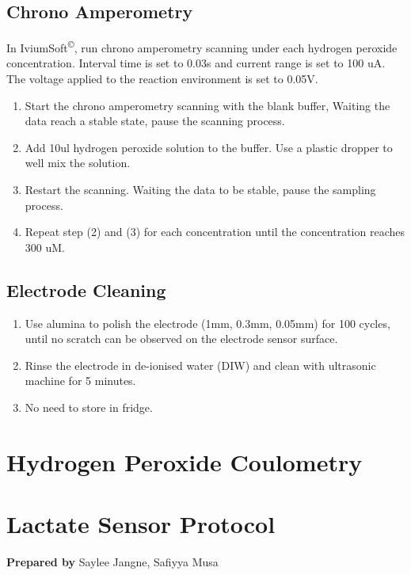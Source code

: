 \begin{appendices}
\subsection{Chrono Amperometry}
In IviumSoft\textsuperscript{\copyright}, run chrono amperometry scanning under each hydrogen peroxide concentration. Interval time is set to 0.03s and current range is set to 100 uA. The voltage applied to the reaction environment is set to 0.05V.

\begin{enumerate}
    \item Start the chrono amperometry scanning with the blank buffer, Waiting the data reach a stable state, pause the scanning process. 
    \item Add 10ul hydrogen peroxide solution to the buffer. Use a plastic dropper to well mix the solution.
    \item Restart the scanning. Waiting the data to be stable, pause the sampling process. 
    \item Repeat step (2) and (3) for each concentration until the concentration reaches 300 uM.
\end{enumerate} 
\subsection{Electrode Cleaning}
\begin{enumerate}
    \item Use alumina to polish the electrode (1mm, 0.3mm, 0.05mm) for 100 cycles, until no scratch can be observed on the electrode sensor surface.
    \item Rinse the electrode in de-ionised water (DIW) and clean with ultrasonic machine for 5 minutes. 
    \item No need to store in fridge.
\end{enumerate}

\newpage
\section{Hydrogen Peroxide Coulometry} \label{app:h2o2_coulometry}


\newpage
\section{Lactate Sensor Protocol}
\label{app:lactate_protocol}
\textbf{Prepared by} Saylee Jangne, Safiyya Musa


\end{appendices}
